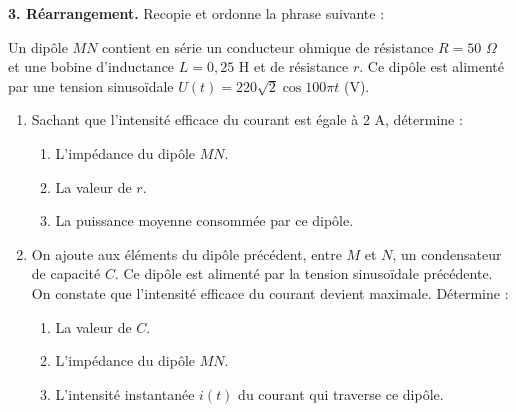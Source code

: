 \documentclass[11pt]{article}
\begin{document}
\medskip
\noindent\textbf{3. Réarrangement.} Recopie et ordonne la phrase suivante :
\begin{center}
\quad {}\quad {}\quad {}\quad {}
\end{center}

Un dipôle $MN$ contient en série un conducteur ohmique de résistance $R = 50$ $\Omega$ et une bobine d'inductance $L = 0{,}25$ H et de résistance $r$. Ce dipôle est alimenté par une tension sinusoïdale $U(t) = 220\sqrt{2}\cos 100\pi t$ (V).

\begin{center}
\end{center}

\begin{enumerate}
  \item Sachant que l'intensité efficace du courant est égale à 2 A, détermine :
  \begin{enumerate}[label=\alph*.]
    \item L'impédance du dipôle $MN$.
    \item La valeur de $r$.
    \item La puissance moyenne consommée par ce dipôle.
  \end{enumerate}
  \item On ajoute aux éléments du dipôle précédent, entre $M$ et $N$, un condensateur de capacité $C$. Ce dipôle est alimenté par la tension sinusoïdale précédente. On constate que l'intensité efficace du courant devient maximale. Détermine :
  \begin{enumerate}[label=\alph*.]
    \item La valeur de $C$.
    \item L'impédance du dipôle $MN$.
    \item L'intensité instantanée $i(t)$ du courant qui traverse ce dipôle.
  \end{enumerate}
\end{enumerate}
\end{document}
